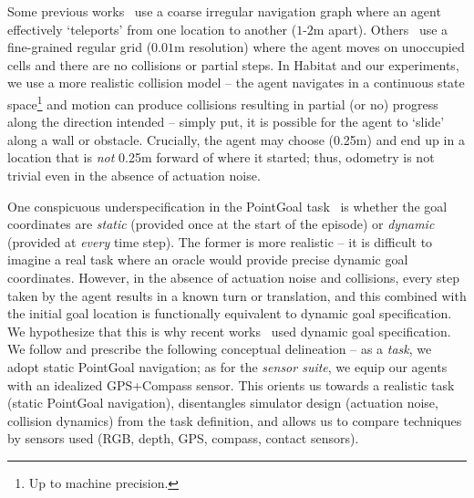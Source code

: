 Some previous works~\cite{Anderson2018-Language} use a coarse 
irregular navigation graph where an agent effectively 
`teleports' from one location to another ($1$-$2\text{m}$ apart). Others~\cite{embodiedqa} use a fine-grained regular grid 
($0.01\text{m}$ resolution) where the agent moves on unoccupied cells 
and there are no collisions or partial steps. 
In Habitat and our experiments, we use a more realistic 
collision model -- 
the agent navigates in 
a continuous state space\footnote{Up to machine precision.}
and motion can produce collisions resulting in partial 
(or no) progress along the direction intended -- simply put, 
it is possible for the agent to `slide' along a wall or obstacle. 
Crucially, the agent may choose \forward (0.25m) and 
end up in a location that is \emph{not} 0.25m 
forward of where it started; thus, 
odometry is not trivial even in the absence of actuation noise. 

One conspicuous underspecification in the PointGoal task~\cite{Anderson2018-Evaluation} is whether the goal coordinates 
are \emph{static} (\ie provided once at the start of the episode) 
or \emph{dynamic} (\ie provided at \emph{every} time step). 
The former is more realistic -- it is difficult to imagine a real 
task where an oracle would provide precise dynamic goal coordinates. 
However, in the absence of actuation noise and collisions, 
every step taken by the agent results in a known turn or 
translation, and this combined with the initial goal location is 
functionally equivalent to dynamic goal specification. 
We hypothesize that this is why recent works~\cite{kojima2019learn, mishkin2019benchmarking, gupta_cvpr17} used dynamic 
goal specification. 
We follow and prescribe the following conceptual delineation 
-- as a \emph{task}, we adopt static PointGoal navigation; 
as for the \emph{sensor suite}, we equip our 
agents with an idealized GPS+Compass sensor.  
This orients us towards a realistic task (static PointGoal navigation), disentangles simulator design 
(actuation noise, collision dynamics) from the task definition, 
and allows us to compare techniques by sensors used 
(RGB, depth, GPS, compass, contact sensors). 


